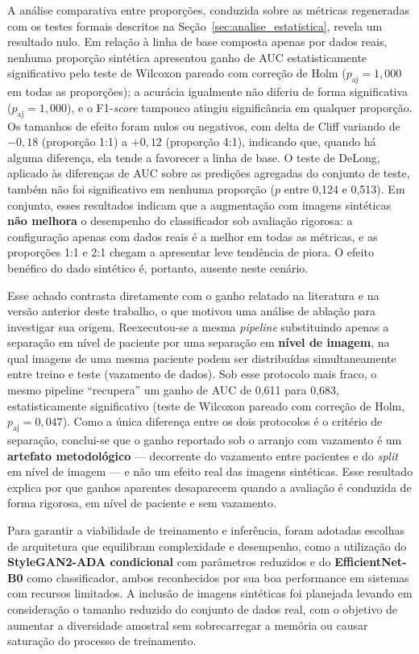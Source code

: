 \documentclass[
	12pt,				%
	openright,			%
	oneside,			%
	a4paper,			%
	tcc,			%
	]{ABNT-DC-UEL}
\begin{document}
A análise comparativa entre proporções, conduzida sobre as métricas regeneradas com os testes formais descritos na Seção~\ref{sec:analise_estatistica}, revela um resultado nulo. Em relação à linha de base composta apenas por dados reais, nenhuma proporção sintética apresentou ganho de AUC estatisticamente significativo pelo teste de Wilcoxon pareado com correção de Holm ($p_{\text{aj}} = 1{,}000$ em todas as proporções); a acurácia igualmente não diferiu de forma significativa ($p_{\text{aj}} = 1{,}000$), e o F1-\textit{score} tampouco atingiu significância em qualquer proporção. Os tamanhos de efeito foram nulos ou negativos, com delta de Cliff variando de $-0{,}18$ (proporção 1:1) a $+0{,}12$ (proporção 4:1), indicando que, quando há alguma diferença, ela tende a favorecer a linha de base. O teste de DeLong, aplicado às diferenças de AUC sobre as predições agregadas do conjunto de teste, também não foi significativo em nenhuma proporção ($p$ entre 0,124 e 0,513). Em conjunto, esses resultados indicam que a augmentação com imagens sintéticas \textbf{não melhora} o desempenho do classificador sob avaliação rigorosa: a configuração apenas com dados reais é a melhor em todas as métricas, e as proporções 1:1 e 2:1 chegam a apresentar leve tendência de piora. O efeito benéfico do dado sintético é, portanto, ausente neste cenário.

Esse achado contrasta diretamente com o ganho relatado na literatura e na versão anterior deste trabalho, o que motivou uma análise de ablação para investigar sua origem. Reexecutou-se a mesma \textit{pipeline} substituindo apenas a separação em nível de paciente por uma separação em \textbf{nível de imagem}, na qual imagens de uma mesma paciente podem ser distribuídas simultaneamente entre treino e teste (vazamento de dados). Sob esse protocolo mais fraco, o mesmo pipeline ``recupera'' um ganho de AUC de 0,611 para 0,683, estatisticamente significativo (teste de Wilcoxon pareado com correção de Holm, $p_{\text{aj}} = 0{,}047$). Como a única diferença entre os dois protocolos é o critério de separação, conclui-se que o ganho reportado sob o arranjo com vazamento é um \textbf{artefato metodológico} — decorrente do vazamento entre pacientes e do \textit{split} em nível de imagem — e não um efeito real das imagens sintéticas. Esse resultado explica por que ganhos aparentes desaparecem quando a avaliação é conduzida de forma rigorosa, em nível de paciente e sem vazamento.

Para garantir a viabilidade de treinamento e inferência, foram adotadas escolhas de arquitetura que equilibram complexidade e desempenho, como a utilização do \textbf{StyleGAN2-ADA condicional} com parâmetros reduzidos e do \textbf{EfficientNet-B0} como classificador, ambos reconhecidos por sua boa performance em sistemas com recursos limitados. A inclusão de imagens sintéticas foi planejada levando em consideração o tamanho reduzido do conjunto de dados real, com o objetivo de aumentar a diversidade amostral sem sobrecarregar a memória ou causar saturação do processo de treinamento.
\end{document}
